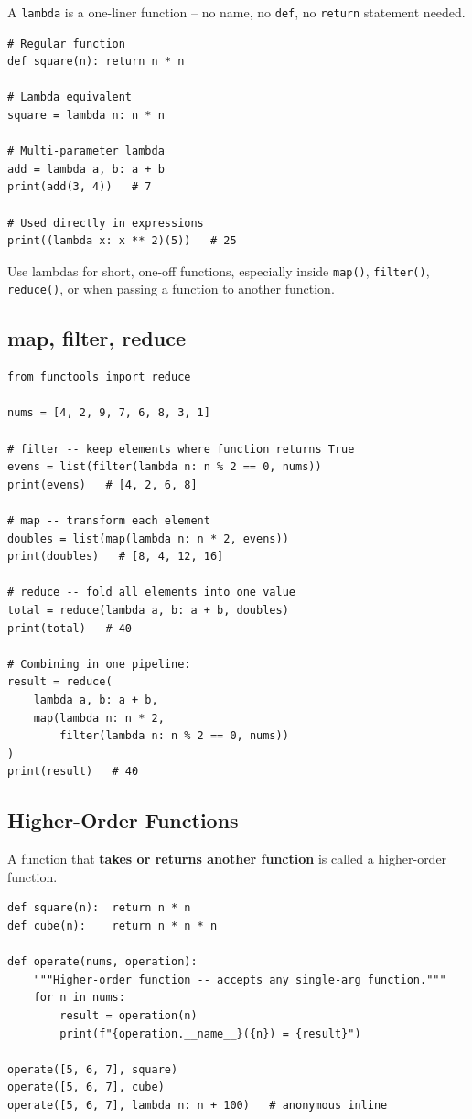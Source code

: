 \documentclass[12pt,a4paper]{article}
\newcommand{\code}[1]{\texttt{\small\color{pyblue}#1}}
\begin{document}
A \code{lambda} is a one-liner function -- no name, no \code{def}, no \code{return} statement needed.

\begin{lstlisting}
# Regular function
def square(n): return n * n

# Lambda equivalent
square = lambda n: n * n

# Multi-parameter lambda
add = lambda a, b: a + b
print(add(3, 4))   # 7

# Used directly in expressions
print((lambda x: x ** 2)(5))   # 25
\end{lstlisting}

\begin{tipbox}
Use lambdas for short, one-off functions, especially inside \code{map()}, \code{filter()}, \code{reduce()}, or when passing a function to another function.
\end{tipbox}

\subsection{map, filter, reduce}

\begin{lstlisting}
from functools import reduce

nums = [4, 2, 9, 7, 6, 8, 3, 1]

# filter -- keep elements where function returns True
evens = list(filter(lambda n: n % 2 == 0, nums))
print(evens)   # [4, 2, 6, 8]

# map -- transform each element
doubles = list(map(lambda n: n * 2, evens))
print(doubles)   # [8, 4, 12, 16]

# reduce -- fold all elements into one value
total = reduce(lambda a, b: a + b, doubles)
print(total)   # 40

# Combining in one pipeline:
result = reduce(
    lambda a, b: a + b,
    map(lambda n: n * 2,
        filter(lambda n: n % 2 == 0, nums))
)
print(result)   # 40
\end{lstlisting}

\subsection{Higher-Order Functions}

A function that \textbf{takes or returns another function} is called a higher-order function.

\begin{lstlisting}
def square(n):  return n * n
def cube(n):    return n * n * n

def operate(nums, operation):
    """Higher-order function -- accepts any single-arg function."""
    for n in nums:
        result = operation(n)
        print(f"{operation.__name__}({n}) = {result}")

operate([5, 6, 7], square)
operate([5, 6, 7], cube)
operate([5, 6, 7], lambda n: n + 100)   # anonymous inline
\end{lstlisting}
\end{document}
